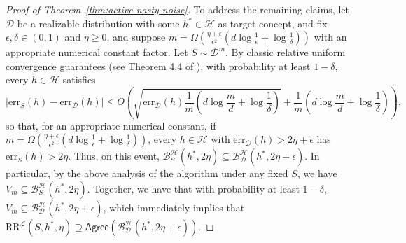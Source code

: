 \documentclass[11pt]{article}
\newcommand{\CR}{\text{RR}}
\newcommand{\err}{\mathrm{err}}
\newcommand{\0}{\mathbf{0}}
\newcommand{\1}{\mathbf{1}}
\newcommand{\cB}{\mathcal{B}}
\newcommand{\cD}{\mathcal{D}}
\newcommand{\cH}{\mathcal{H}}
\newcommand{\cL}{\mathcal{L}}
\newcommand{\Agree}{\mathsf{Agree}}
\begin{document}
\begin{proof}[Proof of Theorem~\ref{thm:active-nasty-noise}]
To address the remaining claims,
let $\cD$ be a realizable distribution with some
$h^* \in \cH$ as target concept,
and fix $\epsilon,\delta \in (0,1)$ and $\eta \geq 0$,
and suppose
$m = \Omega\!\left( \frac{\eta+\epsilon}{\epsilon^2} \left( d \log\frac{1}{\epsilon}+\log\frac{1}{\delta}\right) \right)$
with an appropriate numerical constant factor.
Let $S \sim \cD^m$.
By classic relative uniform convergence guarantees
\cite{vapnik:74}
(see Theorem 4.4 of \cite{vapnik:98}),
with probability at least $1-\delta$,
every $h \in \cH$ satisfies
\begin{equation*}
\left| \err_{S}(h) - \err_{\cD}(h) \right|
\leq O\!\left( \sqrt{ \err_{\cD}(h) \frac{1}{m}\left( d \log \frac{m}{d} + \log\frac{1}{\delta} \right)} + \frac{1}{m}\left( d \log\frac{m}{d}+\log\frac{1}{\delta} \right) \right),
\end{equation*}
so that, for an appropriate numerical constant,
if $m = \Omega\!\left( \frac{\eta+\epsilon}{\epsilon^2} \left( d \log\frac{1}{\epsilon}+\log\frac{1}{\delta}\right) \right)$,
every $h \in \cH$ with $\err_{\cD}(h) > 2 \eta + \epsilon$
has $\err_{S}(h) > 2 \eta$.
Thus, on this event,
$\cB_{S}^{\cH}(h^*,2\eta) \subseteq \cB_{\cD}^{\cH}(h^*,2\eta+\epsilon)$.
In particular, by the above analysis of the algorithm under any fixed $S$,
we have $V_{m} \subseteq \cB_{S}^{\cH}(h^*,2\eta)$.
Together, we have that with probability at least $1-\delta$,
$V_{m} \subseteq \cB_{\cD}^{\cH}(h^*,2\eta+\epsilon)$,
which immediately implies that
$\CR^{\cL}(S,h^*,\eta) \supseteq \Agree(\cB_\cD^\cH(h^*,2\eta+\epsilon))$.


\end{proof}
\end{document}
